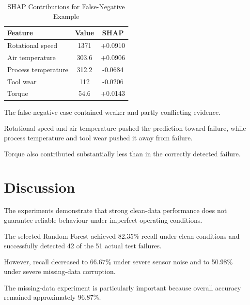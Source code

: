 \documentclass[conference]{IEEEtran}
\begin{document}
\begin{table}[htbp]

\caption{SHAP Contributions for False-Negative Example}

\centering

\begin{tabular}{lcc}

\toprule

\textbf{Feature} &
\textbf{Value} &
\textbf{SHAP}\\

\midrule

Rotational speed & 1371 & +0.0910\\
Air temperature & 303.6 & +0.0906\\
Process temperature & 312.2 & -0.0684\\
Tool wear & 112 & -0.0206\\
Torque & 54.6 & +0.0143\\

\bottomrule

\end{tabular}

\end{table}

The false-negative case contained weaker and partly conflicting evidence.

Rotational speed and air temperature pushed the prediction toward failure, while process temperature and tool wear pushed it away from failure.

Torque also contributed substantially less than in the correctly detected failure.


\section{Discussion}

The experiments demonstrate that strong clean-data performance does not guarantee reliable behaviour under imperfect operating conditions.

The selected Random Forest achieved 82.35\% recall under clean conditions and successfully detected 42 of the 51 actual test failures.

However, recall decreased to 66.67\% under severe sensor noise and to 50.98\% under severe missing-data corruption.

The missing-data experiment is particularly important because overall accuracy remained approximately 96.87\%.
\end{document}
